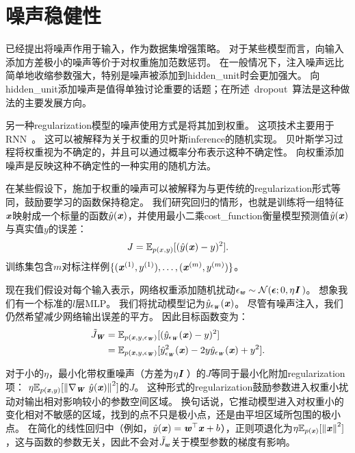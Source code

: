 
\section{噪声稳健性}
\label{sec:noise_robustness}

已经提出将噪声作用于输入，作为数据集增强策略。
对于某些模型而言，向输入添加方差极小的噪声等价于对权重施加范数惩罚\citep{Bishop1995,bishop95training}。
在一般情况下，注入噪声远比简单地收缩参数强大，特别是噪声被添加到\gls{hidden_unit}时会更加强大。
向\gls{hidden_unit}添加噪声是值得单独讨论重要的话题；在所述~\gls{dropout}~算法是这种做法的主要发展方向。

另一种\gls{regularization}模型的噪声使用方式是将其加到权重。
这项技术主要用于\gls{RNN}~\citep{JimGilesHorne1996,Graves-2011}。
这可以被解释为关于权重的贝叶斯\gls{inference}的随机实现。
贝叶斯学习过程将权重视为不确定的，并且可以通过概率分布表示这种不确定性。
向权重添加噪声是反映这种不确定性的一种实用的随机方法。

在某些假设下，施加于权重的噪声可以被解释为与更传统的\gls{regularization}形式等同，鼓励要学习的函数保持稳定。
我们研究回归的情形，也就是训练将一组特征$\boldsymbol{\mathit{x}}$映射成一个标量的函数$\hat y(\boldsymbol{\mathit{x}})$，并使用最小二乘\gls{cost_function}衡量模型预测值$\hat y(\boldsymbol{\mathit{x}})$与真实值$y$的误差：
\begin{align}
 J = \mathbb{E}_{p(x,y)}[(\hat y(\boldsymbol{\mathit{x}}) - y)^2].
\end{align}
训练集包含$m$对标注样例$\{(\boldsymbol{\mathit{x}}^{(1)}, y^{(1)}),\dots,(\boldsymbol{\mathit{x}}^{(m)}, y^{(m)})\}$。

现在我们假设对每个输入表示，网络权重添加随机扰动$\epsilon_{\boldsymbol{\mathit{w}}} \sim \mathcal{N}(\boldsymbol{\epsilon};0, \eta\boldsymbol{\mathit{I}} \, )$。
想象我们有一个标准的$l$层MLP。
我们将扰动模型记为$\hat y_{\epsilon_{\boldsymbol{\mathit{W}}}} (\boldsymbol{\mathit{x}})$。
尽管有噪声注入，我们仍然希望减少网络输出误差的平方。
因此目标函数变为：
\begin{align}
 \tilde J_{\boldsymbol{\mathit{W}}} &= \mathbb{E}_{p(\boldsymbol{\mathit{x}},y,\epsilon_{\boldsymbol{\mathit{W}}})}[(\hat y_{\epsilon_{\boldsymbol{\mathit{W}}}}(\boldsymbol{\mathit{x}}) - y)^2] \\
   &=  \mathbb{E}_{p(\boldsymbol{\mathit{x}},y,\epsilon_{\boldsymbol{\mathit{W}}})}[\hat y_{\epsilon_{\boldsymbol{\mathit{W}}}}^2(\boldsymbol{\mathit{x}}) -  2y\hat y_{\epsilon_{\boldsymbol{\mathit{W}}}}
   (\boldsymbol{\mathit{x}})+ y^2] .
\end{align}

对于小的$\eta$，最小化带权重噪声（方差为$\eta \boldsymbol{\mathit{I}}$\,）的$J$等同于最小化附加\gls{regularization}项：
$ \eta \mathbb{E}_{p(\boldsymbol{\mathit{x}},y)}[\left\lVert\nabla_{\boldsymbol{\mathit{W}}}~\hat y(\boldsymbol{\mathit{x}})\right\rVert^2]$的$J$。
这种形式的\gls{regularization}鼓励参数进入权重小扰动对输出相对影响较小的参数空间区域。
换句话说，它推动模型进入对权重小的变化相对不敏感的区域，找到的点不只是极小点，还是由平坦区域所包围的极小点\citep{Hochreiter95}。
在简化的线性回归中（例如，$\hat y(\boldsymbol{\mathit{x}}) = \boldsymbol{\mathit{w}}^\top \boldsymbol{\mathit{x}} + b$），正则项退化为$ \eta \mathbb{E}_{p(\boldsymbol{\mathit{x}})}[\left\lVert\boldsymbol{\mathit{x}}\right\rVert^2]$，这与函数的参数无关，因此不会对$\tilde J_{\boldsymbol{\mathit{w}}}$关于模型参数的梯度有影响。

